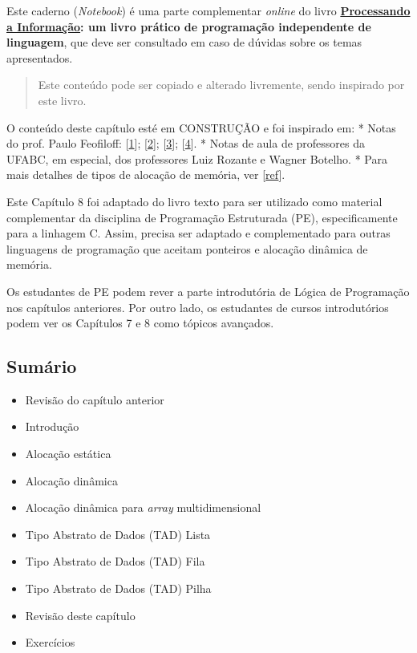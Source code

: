 \documentclass[12pt,a4paper]{article}
\providecommand{\tightlist}{%
      \setlength{\itemsep}{0pt}\setlength{\parskip}{0pt}}
\begin{document}
Este caderno (\emph{Notebook}) é uma parte complementar \emph{online} do
livro
\textbf{\href{https://editora.ufabc.edu.br/matematica-e-ciencias-da-computacao/58-processando-a-informacao}{Processando
a Informação}: um livro prático de programação independente de
linguagem}, que deve ser consultado em caso de dúvidas sobre os temas
apresentados.

\begin{quote}
Este conteúdo pode ser copiado e alterado livremente, sendo inspirado
por este livro.
\end{quote}

    O conteúdo deste capítulo esté em CONSTRUÇÃO e foi inspirado em: * Notas
do prof. Paulo Feofiloff:
{[}\href{https://www.ime.usp.br/~pf/algoritmos/aulas/pont.html}{1}{]};
{[}\href{https://www.ime.usp.br/~pf/algoritmos/aulas/aloca.html}{2}{]};
{[}\href{https://www.ime.usp.br/~pf/algoritmos/aulas/lista.html}{3}{]};
{[}\href{https://www.ime.usp.br/~pf/algoritmos/aulas/fila.html}{4}{]}. *
Notas de aula de professores da UFABC, em especial, dos professores Luiz
Rozante e Wagner Botelho. * Para mais detalhes de tipos de alocação de
memória, ver
{[}\href{https://www.inf.ufpr.br/roberto/ci067/10_aloc.html}{ref}{]}.

Este Capítulo 8 foi adaptado do livro texto para ser utilizado como
material complementar da disciplina de Programação Estruturada (PE),
especificamente para a linhagem C. Assim, precisa ser adaptado e
complementado para outras linguagens de programação que aceitam
ponteiros e alocação dinâmica de memória.

Os estudantes de PE podem rever a parte introdutória de Lógica de
Programação nos capítulos anteriores. Por outro lado, os estudantes de
cursos introdutórios podem ver os Capítulos 7 e 8 como tópicos
avançados.

    \hypertarget{sumuxe1rio}{%
\subsection{Sumário}\label{sumuxe1rio}}

\begin{itemize}
\tightlist
\item
  Revisão do capítulo anterior
\item
  Introdução
\item
  Alocação estática
\item
  Alocação dinâmica
\item
  Alocação dinâmica para \emph{array} multidimensional
\item
  Tipo Abstrato de Dados (TAD) Lista
\item
  Tipo Abstrato de Dados (TAD) Fila
\item
  Tipo Abstrato de Dados (TAD) Pilha
\item
  Revisão deste capítulo
\item
  Exercícios
\end{itemize}
\end{document}
